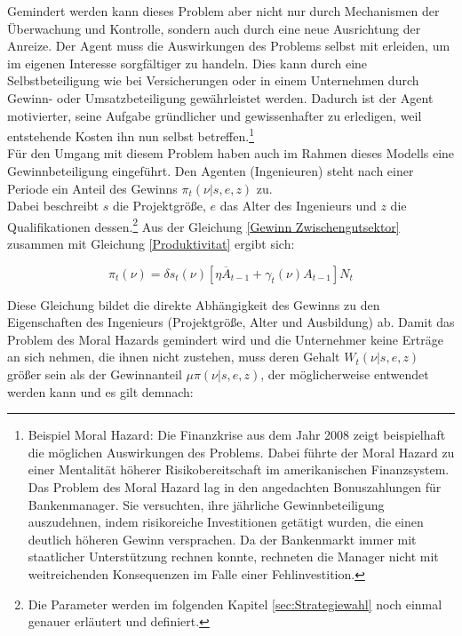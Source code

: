 Gemindert werden kann dieses Problem aber nicht nur durch Mechanismen der Überwachung und Kontrolle, sondern auch durch eine neue Ausrichtung der Anreize. Der Agent muss die Auswirkungen des Problems selbst mit erleiden, um im eigenen Interesse sorgfältiger zu handeln. Dies kann durch eine Selbstbeteiligung wie bei Versicherungen oder in einem Unternehmen durch Gewinn- oder Umsatzbeteiligung gewährleistet werden. Dadurch ist der Agent motivierter, seine Aufgabe gründlicher und gewissenhafter zu erledigen, weil entstehende Kosten ihn nun selbst betreffen.\footnote{Beispiel Moral Hazard: Die Finanzkrise aus dem Jahr 2008 zeigt beispielhaft die möglichen Auswirkungen des Problems. Dabei führte der Moral Hazard zu einer Mentalität höherer Risikobereitschaft im amerikanischen Finanzsystem. Das Problem des Moral Hazard lag in den angedachten Bonuszahlungen für Bankenmanager. Sie versuchten, ihre jährliche Gewinnbeteiligung auszudehnen, indem risikoreiche Investitionen getätigt wurden, die einen deutlich höheren Gewinn versprachen. Da der Bankenmarkt immer mit staatlicher Unterstützung rechnen konnte, rechneten die Manager nicht mit weitreichenden Konsequenzen im Falle einer Fehlinvestition.}\\
Für den Umgang mit diesem Problem haben auch \citet{Acemoglu.2006} im Rahmen dieses Modells eine Gewinnbeteiligung eingeführt. Den Agenten (Ingenieuren) steht nach einer Periode ein Anteil des Gewinns $\pi_t(\nu|s,e,z)$ zu.\\
Dabei beschreibt $s$ die Projektgrö{\ss}e, $e$ das Alter des Ingenieurs und $z$ die Qualifikationen dessen.\footnote{Die Parameter werden im folgenden Kapitel \ref{sec:Strategiewahl} noch einmal genauer erläutert und definiert.}  Aus der Gleichung  \eqref{Gewinn Zwischengutsektor} zusammen mit Gleichung \eqref{Produktivitat} ergibt sich:

	
	\begin{equation}
		\pi_t(\nu)=\delta s_t(\nu)[\eta\overline{A}_{t-1}+\gamma_t(\nu)A_{t-1}]N_t
	\end{equation}


Diese Gleichung bildet die direkte Abhängigkeit des Gewinns zu den Eigenschaften des Ingenieurs (Projektgrö{\ss}e, Alter und Ausbildung) ab.  Damit das Problem des Moral Hazards gemindert wird und die Unternehmer keine Erträge an sich nehmen, die ihnen nicht zustehen, muss deren Gehalt $W_t(\nu|s,e,z)$ grö{\ss}er sein als der Gewinnanteil $\mu\pi(\nu|s,e,z)$, der möglicherweise entwendet werden kann und es gilt demnach:


